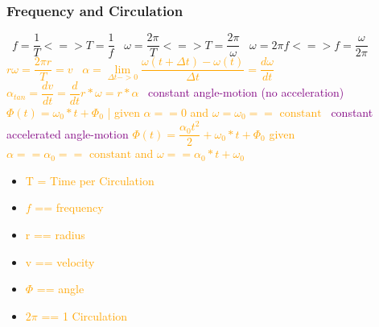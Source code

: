 \documentclass[main.tex,fontsize=8pt,paper=a4,paper=portrait,DIV=calc,]{scrartcl}
\begin{document}
\begin{multicols*}{2}
\subsubsection{Frequency and Circulation}
\, \newline
\large \( f = \dfrac{1}{T} <=> T = \dfrac{1}{f} \)\newline
\, \newline
\large \( \omega = \dfrac{2\pi}{T} <=> T = \dfrac{2\pi}{\omega} \)\newline
\, \newline
\large \( \omega = 2\pi f <=> f = \dfrac{\omega}{2\pi} \)\newline
\, \newline
\large \textcolor{orange}{\( r \omega = \dfrac{2\pi r}{T} = v \)}\newline
\, \newline
\large \textcolor{orange}{\( \alpha = \underset{\Delta t -> 0}{\lim} \dfrac{\omega (t + \Delta t) - \omega (t)}{\Delta t} = \dfrac{d\omega}{dt} \)}\newline 
\, \newline
\large \textcolor{orange}{\( \alpha_{tan} = \dfrac{dv}{dt} = \dfrac{d}{dt}r * \omega = r * \alpha \)}\newline 
\, \newline
\textcolor{purple}{constant angle-motion (no acceleration)}\newline
\large \textcolor{orange}{\( \Phi(t) = \omega_0 * t + \Phi_0 \)  | given \(\alpha == 0 \) and \( \omega = \omega_0 == \text{ constant} \)}\newline
\, \newline
\textcolor{purple}{constant accelerated angle-motion}\newline
\large \textcolor{orange}{\( \Phi(t) = \dfrac{\alpha_0 t^2}{2} + \omega_0 * t + \Phi_0 \) \newline given \( \alpha == \alpha_0 == \text{ constant} \) and \(\omega == \alpha_0 * t + \omega_0 \) }\newline
\, \newline \normalsize
\begin{itemize}
\item \textcolor{orange}{T = Time per Circulation}
\item \textcolor{orange}{\(f\) == frequency}
\item \textcolor{orange}{r == radius}
\item \textcolor{orange}{v == velocity}
\item \textcolor{orange}{\(\Phi\) == angle}
\item \textcolor{orange}{\(2\pi\) == 1 Circulation}
\end{itemize}


\end{multicols*}
\end{document}

